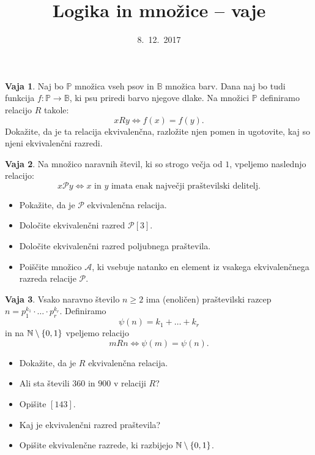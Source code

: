 \documentclass{article}
\newcommand{\NN}{\mathbb{N}}
\theoremstyle{definition}
\newtheorem{vaja}{Vaja}
\begin{document}
\title{Logika in množice -- vaje}
\date{8.~12.~2017}
\maketitle

\begin{vaja}
  Naj bo $\mathbb{P}$ množica vseh psov in $\mathbb{B}$ množica barv. Dana naj bo tudi funkcija $f\colon \mathbb{P} \to \mathbb{B}$, ki psu priredi barvo njegove dlake. Na množici $\mathbb{P}$ definiramo relacijo $R$ takole:
  \begin{equation*}
    x R y \iff f(x) = f(y).
  \end{equation*}
  Dokažite, da je ta relacija ekvivalenčna, razložite njen pomen in ugotovite, kaj so njeni ekvivalenčni razredi.
\end{vaja}

\begin{vaja}
  Na množico naravnih števil, ki so strogo večja od $1$, vpeljemo naslednjo relacijo:
  \[x \mathcal{P} y \iff \text{$x$ in $y$ imata enak največji praštevilski delitelj}.\]
  \begin{itemize}
    \item
      Pokažite, da je $\mathcal{P}$ ekvivalenčna relacija.
    \item
      Določite ekvivalenčni razred $\mathcal{P}[3]$.
    \item
      Določite ekvivalenčni razred poljubnega praštevila.
    \item
      Poiščite množico $\mathcal{A}$, ki vsebuje natanko en element iz vsakega ekvivalenčnega razreda relacije $\mathcal{P}$.
  \end{itemize}
\end{vaja}

\begin{vaja}
  Vsako naravno število $n \geq 2$ ima (enoličen) praštevilski razcep $n = p_1^{k_1} \cdot \ldots \cdot p_r^{k_r}$. Definiramo
  \[\psi(n) = k_1 + \ldots + k_r\]
  in na $\NN \setminus \set{0, 1}$ vpeljemo relacijo
  \[m R n \iff \psi(m) = \psi(n).\]
  \begin{itemize}
    \item Dokažite, da je $R$ ekvivalenčna relacija.
    \item Ali sta števili $360$ in $900$ v relaciji $R$?
    \item Opišite $[143]$.
    \item Kaj je ekvivalenčni razred praštevila?
    \item Opišite ekvivalenčne razrede, ki razbijejo $\NN \setminus \set{0, 1}$.
  \end{itemize}
\end{vaja}
\end{document}
